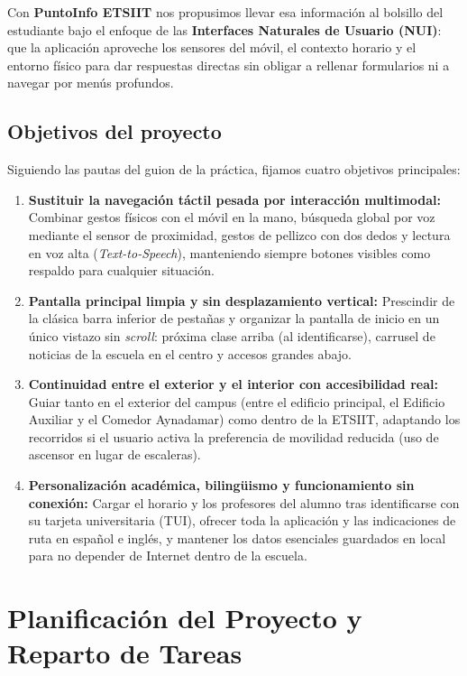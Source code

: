 \documentclass[11pt,a4paper]{article}
\begin{document}
Con \textbf{PuntoInfo ETSIIT} nos propusimos llevar esa información al bolsillo del estudiante bajo el enfoque de las \textbf{Interfaces Naturales de Usuario (NUI)}: que la aplicación aproveche los sensores del móvil, el contexto horario y el entorno físico para dar respuestas directas sin obligar a rellenar formularios ni a navegar por menús profundos.

\vspace{-0.25cm}
\subsection{Objetivos del proyecto}
Siguiendo las pautas del guion de la práctica, fijamos cuatro objetivos principales:
\begin{enumerate}[leftmargin=1.8em]
    \item \textbf{Sustituir la navegación táctil pesada por interacción multimodal:} Combinar gestos físicos con el móvil en la mano, búsqueda global por voz mediante el sensor de proximidad, gestos de pellizco con dos dedos y lectura en voz alta (\textit{Text-to-Speech}), manteniendo siempre botones visibles como respaldo para cualquier situación.
    \item \textbf{Pantalla principal limpia y sin desplazamiento vertical:} Prescindir de la clásica barra inferior de pestañas y organizar la pantalla de inicio en un único vistazo sin \textit{scroll}: próxima clase arriba (al identificarse), carrusel de noticias de la escuela en el centro y accesos grandes abajo.
    \item \textbf{Continuidad entre el exterior y el interior con accesibilidad real:} Guiar tanto en el exterior del campus (entre el edificio principal, el Edificio Auxiliar y el Comedor Aynadamar) como dentro de la ETSIIT, adaptando los recorridos si el usuario activa la preferencia de movilidad reducida (uso de ascensor en lugar de escaleras).
    \item \textbf{Personalización académica, bilingüismo y funcionamiento sin conexión:} Cargar el horario y los profesores del alumno tras identificarse con su tarjeta universitaria (TUI), ofrecer toda la aplicación y las indicaciones de ruta en español e inglés, y mantener los datos esenciales guardados en local para no depender de Internet dentro de la escuela.
\end{enumerate}

\vspace{-0.25cm}
\section{Planificación del Proyecto y Reparto de Tareas}
\end{document}
